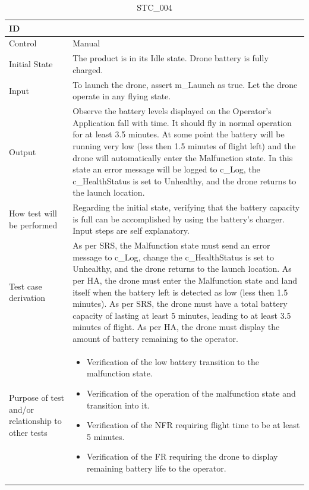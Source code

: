 \documentclass[12pt, titlepage]{article}
\begin{document}
\begin{enumerate}
\begin{table}[!h]
\begin{center}
\caption {STC\_004}
\label{tab:STC_004}
\begin{tabular}{ | m{3.2cm} | m{12.2cm} | } 
\hline
ID & \nameref{tab:STC_004} \\ 
\hline
Control & Manual \\ 
\hline
Initial State & The product is in its Idle state. Drone battery is fully charged. \\ 
\hline
Input & To launch the drone, assert m\_Launch as true. Let the drone operate in any flying state. \\ 
\hline
Output & Observe the battery levels displayed on the Operator’s Application fall with time. It should fly in normal operation for at least 3.5 minutes.
At some point the battery will be running very low (less then 1.5 minutes of flight left) and the drone will automatically enter the Malfunction state. In this state an error message will be logged to c\_Log, the c\_HealthStatus is set to Unhealthy, and the drone returns to the launch location. \\ 
\hline
How test will be performed & Regarding the initial state, verifying that the battery capacity is full can be accomplished by using the battery's charger. Input steps are self explanatory. \\ 
\hline
Test case derivation & As per SRS, the Malfunction state must send an error message to c\_Log, change the c\_HealthStatus is set to Unhealthy, and the drone returns to the launch location.
As per HA, the drone must enter the Malfunction state and land itself when the battery left is detected as low (less then 1.5 minutes). As per SRS, the drone must have a total battery capacity of lasting at least 5 minutes, leading to at least 3.5 minutes of flight.
As per HA, the drone must display the amount of battery remaining to the operator. 
 \\ 
\hline
Purpose of test and/or relationship to other tests & 
\begin{itemize}
    \item Verification of the low battery transition to the malfunction state. 
    \item Verification of the operation of the malfunction state and transition into it.
    \item Verification of the NFR requiring flight time to be at least 5 minutes. 
    \item Verification of the FR requiring the drone to display remaining battery life to the operator. 
\end{itemize}
\\ 
\hline
\end{tabular}
\end{center}
\end{table}


\end{enumerate}
\end{document}
